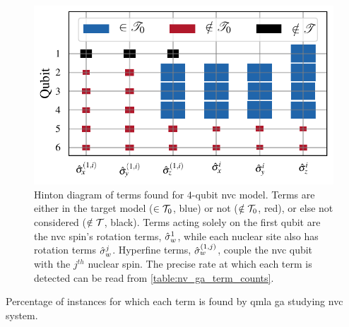 \begin{figure}
    \begin{center}
        \includegraphics{experimental_study/figures/nv_gen_alg_hinton.pdf}
    \end{center}
    \caption[Hinton diagram of terms found for $4$-qubit \gls{nvc} model.]{
        Hinton diagram of terms found for $4$-qubit \gls{nvc} model.
        Terms are either in the target model ($\in { \mathcal{T} }_0$, blue) or not ($\notin { \mathcal{T} }_0$, red), 
        or else not considered ($\notin { \mathcal{T} }$, black). 
        Terms acting solely on the first qubit are the \gls{nvc} spin's rotation terms, $\hat{\sigma}_w^1$,
            while each nuclear site also has rotation terms $\hat{\sigma}_w^j$.
            Hyperfine terms, $\hat{\sigma}_w^{(1,j)}$, couple the \gls{nvc} qubit with the $j^{th}$ nuclear spin. 
            The precise rate at which each term is detected can be read from \cref{table:nv_ga_term_counts}. 
        }
\end{figure}

\begin{table}
    \begin{center}
        
    \end{center}
    \caption[Percentage of instances for which each term is found by \gls{qmla} \gls{ga} studying \gls{nvc} system.]{
        Percentage of instances for which each term is found by \gls{qmla} \gls{ga} studying \gls{nvc} system.
    }
    \label{table:nv_ga_term_counts}
\end{table}